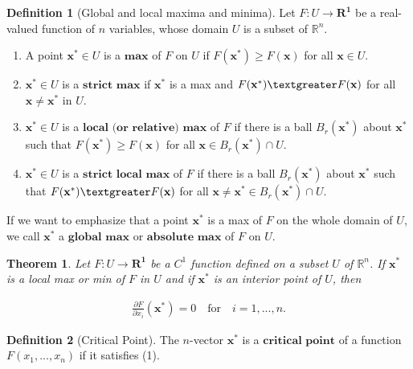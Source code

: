 \documentclass{article}
\newtheorem{theorem}{Theorem}
\theoremstyle{definition}
\newtheorem{definition}{Definition}
\theoremstyle{Solution}
\begin{document}
\begin{definition}[Global and local maxima and minima] Let $F: U \mathbf{ \rightarrow R^1}$ be a real-valued function of $n$ variables, whose domain $U$ is a subset of $\mathbb{R}^n$.
\begin{enumerate}
	\item A point $\textbf{x}^* \in U$ is a $\textbf{max}$ of $F$ on $U$ if $F(\textbf{x}^*) \geq F(\textbf{x})$ for all $\textbf{x} \in U$.
	\item $\textbf{x}^* \in U$ is a $\textbf{strict max}$ if $\textbf{x}^*$ is a max and $F(\textbf{x}^*) \textgreater F(\textbf{x})$ for all $\textbf{x} \neq \textbf{x}^*$ in $U$.
	\item $\textbf{x}^* \in U$ is a $\textbf{local (or relative) max}$ of $F$ if there is a ball $B_r(\textbf{x}^*)$ about $\textbf{x}^*$ such that $F(\textbf{x}^*) \geq F(\textbf{x})$ for all $\textbf{x} \in B_r(\textbf{x}^*) \cap U$.
	\item $\textbf{x}^* \in U$ is a $\textbf{strict local max}$ of $F$ if there is a ball $B_r(\textbf{x}^*)$ about $\textbf{x}^*$ such that $F(\textbf{x}^*) \textgreater F(\textbf{x})$ for all $\textbf{x} \neq \textbf{x}^* \in B_r(\textbf{x}^*) \cap U$.
\end{enumerate}

If we want to emphasize that a point $\textbf{x}^*$ is a max of $F$ on the whole domain of $U$, we call $\textbf{x}^*$ a $\textbf{global max}$ or $\textbf{absolute max}$ of $F$ on $U$.
\end{definition}

\begin{theorem}
Let $F: U \mathbf{ \rightarrow R^1}$ be a $C^1$ function defined on a subset $U$ of $\mathbb{R}^n$. If $\mathbf{x}^*$ is a local max or min of $F$ in $U$ and if $\mathbf{x}^*$ is an interior point of $U$, then
 \end{theorem}

\begin{align}
\frac{\partial F}{\partial x_i}(\mathbf{x}^*)=0 \quad \text{for} \quad i=1,...,n.
\end{align}

\begin{definition}[Critical Point] The $n$-vector $\mathbf{x}^*$ is a $\textbf{critical point}$ of a function $F(x_1,...,x_n)$ if it satisfies (1).
\end{definition}
\end{document}
